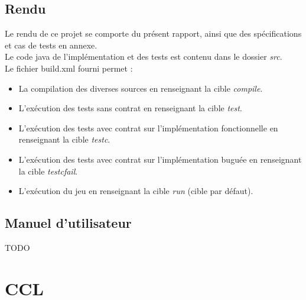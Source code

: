\documentclass[a4paper, 11pt, notitlepage]{article}
\begin{document}
\subsection{Rendu}

Le rendu de ce projet se comporte du présent rapport, ainsi que des spécifications et cas de tests en annexe. \\
Le code java de l'implémentation et des tests est contenu dans le dossier \emph{src}. \\

Le fichier build.xml fourni permet : \\

\begin{itemize}
\item La compilation des diverses sources en renseignant la cible \emph{compile}.  \\
\item L'exécution des tests sans contrat en renseignant la cible \emph{test}. \\
\item L'exécution des tests avec contrat sur l'implémentation fonctionnelle en renseignant la cible \emph{testc}. \\
\item L'exécution des tests avec contrat sur l'implémentation buguée en renseignant la cible \emph{testcfail}. \\
\item L'exécution du jeu en renseignant la cible \emph{run} (cible par défaut).\\
\end{itemize}


\subsection{Manuel d'utilisateur}

TODO



\section*{CCL}

























\newpage
\pagestyle{empty}


\newpage
\pagestyle{empty}

\end{document}
